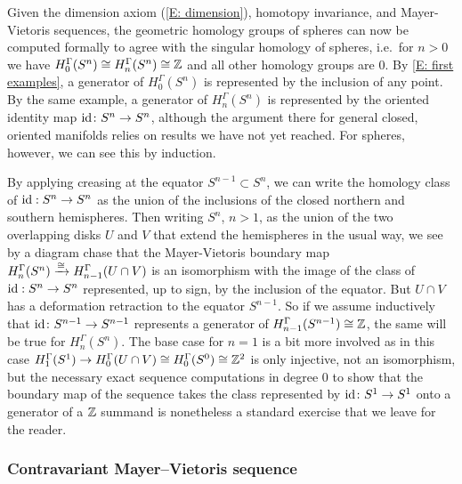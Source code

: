 \begin{example}\label{E: sphere homology}
Given the dimension axiom (\cref{E: dimension}), homotopy invariance, and Mayer-Vietoris sequences, the geometric homology groups of spheres can now be computed formally to agree with the singular homology of spheres, i.e.\ for $n>0$ we have $H_0^{\Gamma}(S^n)\cong H_n^\Gamma(S^n)\cong \mathbb{Z}$ and all other homology groups are $0$.
By \cref{E: first examples}, a generator of $H_0^{\Gamma}(S^n)$ is represented by the inclusion of any point.
By the same example, a generator of $H_n^{\Gamma}(S^n)$ is represented by the oriented identity map $\mathrm{id} \colon S^n \to S^n$, although the argument there for general closed, oriented manifolds relies on results we have not yet reached.
For spheres, however, we can see this by induction.

By applying creasing at the equator $S^{n-1}\subset S^n$, we can write the homology class of $\mathrm{id}: S^n \to S^n$ as the union of the inclusions of the closed northern and southern hemispheres. Then writing $S^n$, $n>1$, as the union of the two overlapping disks $U$ and $V$ that extend the hemispheres in the usual way, we see by a diagram chase that the Mayer-Vietoris boundary map $H_n^\Gamma(S^n)\xrightarrow{\cong} H_{n-1}^\Gamma(U \cap V)$ is an isomorphism with the image of the class of $\mathrm{id}: S^n \to S^n$ represented, up to sign, by the inclusion of the equator.
But $U \cap V$ has a deformation retraction to the equator $S^{n-1}$.
So if we assume inductively that $\mathrm{id} \colon S^{n-1} \to S^{n-1}$ represents a generator of $H_{n-1}^\Gamma(S^{n-1})\cong \mathbb{Z}$, the same will be true for $H_n^\Gamma(S^n)$.
The base case for $n=1$ is a bit more involved as in this case $H_1^\Gamma(S^1) \to H_{0}^\Gamma(U \cap V) \cong H_0^\Gamma(S^0) \cong \mathbb{Z}^2$ is only injective, not an isomorphism, but the necessary exact sequence computations in degree $0$ to show that the boundary map of the sequence takes the class represented by $\mathrm{id} \colon S^1 \to S^1$ onto a generator of a $\mathbb{Z}$ summand is nonetheless a standard exercise that we leave for the reader.
\end{example}

\subsubsection{Contravariant Mayer--Vietoris sequence}

\begin{comment}
	\red{[GBF: Note - the work in this section uses the following formulas which need to be confirmed at some point and stated clearly: $\bd W^- = W^0+(\bd W)^+$, $\bd W^+ = - W^0+(\bd W)^-$, $\bd W^0 = -(\bd W)^0$.
		The should all follow from the Liebniz rule for pullbacks using $W^- = \varphi^{-1}([0,p]) \times_M W$, $W^+ = \varphi^{-1}([p,1]) \times_M W$, and $W^0 = \varphi^{-1}(p) \times_M W$.
		PLEASE DO NOT ERASE THIS NOTE UNTIL THESE FORMULAS HAVE BEEN ESTABLISHED AND WRITTEN INTO THE PAPER SOMEWHERE]}
\end{comment}

